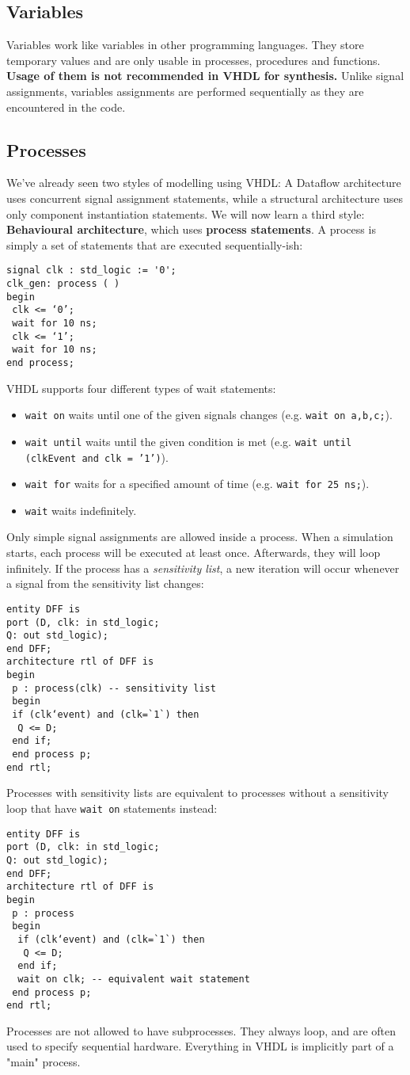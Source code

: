 \documentclass{report}
\newcommand{\tbf}{\textbf}
\begin{document}
\subsection{Variables}
Variables work like variables in other programming languages. They store temporary values and are only usable in processes, procedures and functions. \tbf{Usage of them is not recommended in VHDL for synthesis.} Unlike signal assignments, variables assignments are performed sequentially as they are encountered in the code.
\clearpage
\subsection{Processes}
We've already seen two styles of modelling using VHDL: A Dataflow architecture uses concurrent signal assignment statements, while a structural architecture uses only component instantiation statements. We will now learn a third style: \tbf{Behavioural architecture}, which uses  \tbf{process statements}. A process is simply a set of statements that are executed sequentially-ish:
\begin{verbatim}
signal clk : std_logic := '0';
clk_gen: process ( )
begin
 clk <= ‘0’;
 wait for 10 ns;
 clk <= ‘1’;
 wait for 10 ns;
end process;
\end{verbatim}
VHDL supports four different types of wait statements:
\begin{itemize}
    \item \texttt{wait on} waits until one of the given signals changes (e.g. \texttt{wait on a,b,c;}).
    \item \texttt{wait until} waits until the given condition is met (e.g. \texttt{wait until (clkEvent and clk = '1')}).
    \item \texttt{wait for} waits for a specified amount of time (e.g. \texttt{wait for 25 ns;}).
    \item \texttt{wait} waits indefinitely.
\end{itemize}
Only simple signal assignments are allowed inside a process. When a simulation starts, each process will be executed at least once. Afterwards, they will loop infinitely. If the process has a \textit{sensitivity list}, a new iteration will occur whenever a signal from the sensitivity list changes:
\begin{verbatim}
entity DFF is
port (D, clk: in std_logic;
Q: out std_logic);
end DFF;
architecture rtl of DFF is
begin
 p : process(clk) -- sensitivity list
 begin
 if (clk‘event) and (clk=`1`) then
  Q <= D;
 end if;
 end process p;
end rtl;    
\end{verbatim}
Processes with sensitivity lists are equivalent to processes without a sensitivity loop that have \texttt{wait on} statements instead:
\begin{verbatim}
entity DFF is
port (D, clk: in std_logic;
Q: out std_logic);
end DFF;
architecture rtl of DFF is
begin
 p : process
 begin
  if (clk‘event) and (clk=`1`) then
   Q <= D;
  end if;
  wait on clk; -- equivalent wait statement
 end process p;
end rtl;
\end{verbatim}
Processes are not allowed to have subprocesses. They always loop, and are often used to specify sequential hardware. Everything in VHDL is implicitly part of a "main" process.
\end{document}
